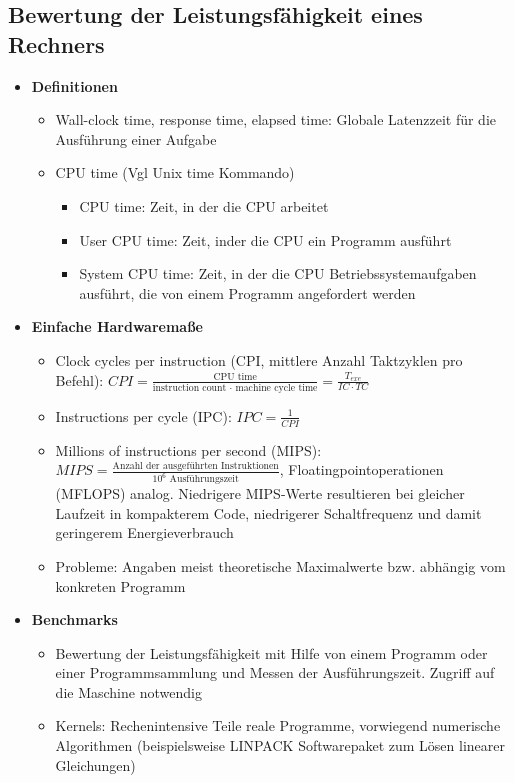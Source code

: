 \subsection{Bewertung der Leistungsfähigkeit eines Rechners}
\begin{itemize}
	\item \textbf{Definitionen}
	\begin{itemize}
		\item Wall-clock time, response time, elapsed time: Globale Latenzzeit für die Ausführung einer Aufgabe
		\item CPU time (Vgl Unix time Kommando)
		\begin{itemize}
			\item CPU time: Zeit, in der die CPU arbeitet
			\item User CPU time: Zeit, inder die CPU ein Programm ausführt
			\item System CPU time: Zeit, in der die CPU Betriebssystemaufgaben ausführt, die von einem Programm angefordert werden
		\end{itemize}
	\end{itemize}
	\item \textbf{Einfache Hardwaremaße}
	\begin{itemize}
		\item Clock cycles per instruction (CPI, mittlere Anzahl Taktzyklen pro Befehl): \(CPI = \frac{\text{CPU time}}{\text{instruction count } \cdot \text{ machine cycle time}} = \frac{T_{exe}}{IC \cdot TC}\)
		\item Instructions per cycle (IPC): \(IPC = \frac{1}{CPI}\)
		\item Millions of instructions per second (MIPS): \(MIPS = \frac{\text{Anzahl der ausgeführten Instruktionen}}{10^6 \text{ Ausführungszeit}}\), Floatingpointoperationen (MFLOPS) analog. Niedrigere MIPS-Werte resultieren bei gleicher Laufzeit in kompakterem Code, niedrigerer Schaltfrequenz und damit geringerem Energieverbrauch
		\item Probleme: Angaben meist theoretische Maximalwerte bzw. abhängig vom konkreten Programm
	\end{itemize}
	\item \textbf{Benchmarks}
	\begin{itemize}
		\item Bewertung der Leistungsfähigkeit mit Hilfe von einem Programm oder einer Programmsammlung und Messen der Ausführungszeit. Zugriff auf die Maschine notwendig
		\item Kernels: Rechenintensive Teile reale Programme, vorwiegend numerische Algorithmen (beispielsweise LINPACK Softwarepaket zum Lösen linearer Gleichungen)

\end{itemize}
\end{itemize}
